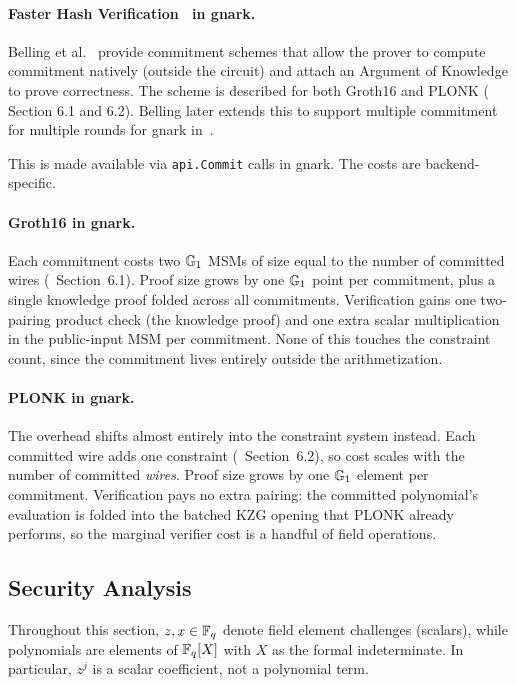 \paragraph{Faster Hash Verification~\cite{CCS:BelSolBeg23} in gnark.} \label{sec:iop:fs:gnark}
Belling et al.~\cite{CCS:BelSolBeg23} provide commitment schemes that allow the prover to compute commitment natively (outside the circuit) and attach an Argument of Knowledge to prove correctness. The scheme is described for both Groth16 and PLONK (\cite{CCS:BelSolBeg23} Section 6.1 and 6.2). Belling later extends this to support multiple commitment for multiple rounds for gnark in~\cite{mrmc}.

This is made available via \texttt{api.Commit} calls in gnark. The costs are backend-specific.

\paragraph{Groth16 in gnark.} Each commitment costs two $\mathbb{G}_1$ MSMs of size equal to the number of committed wires (\cite{CCS:BelSolBeg23}~Section~6.1). Proof size grows by one $\mathbb{G}_1$ point per commitment, plus a single knowledge proof folded across all commitments. Verification gains one two-pairing product check (the knowledge proof) and one extra scalar multiplication in the public-input MSM per commitment. None of this touches the constraint count, since the commitment lives entirely outside the arithmetization.

\paragraph{PLONK in gnark.} The overhead shifts almost entirely into the constraint system instead. Each committed wire adds one constraint (\cite{CCS:BelSolBeg23}~Section~6.2), so cost scales with the number of committed \emph{wires}. Proof size grows by one $\mathbb{G}_1$ element per commitment. Verification pays no extra pairing: the committed polynomial's evaluation is folded into the batched KZG opening that PLONK already performs, so the marginal verifier cost is a handful of field operations.

\subsection{Security Analysis}

Throughout this section, $z, x \in \mathbb{F}_q$ denote field element challenges (scalars),
while polynomials are elements of $\mathbb{F}_q[X]$ with $X$ as the formal indeterminate.
In particular, $z^j$ is a scalar coefficient, not a polynomial term.

